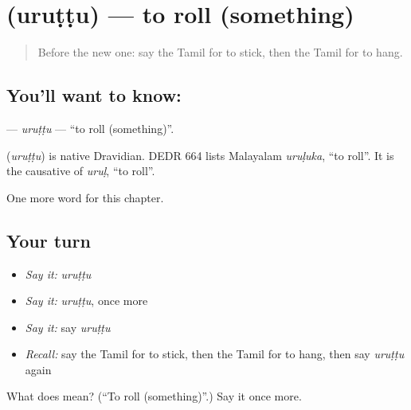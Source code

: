 \section[\texorpdfstring{\ta{உருட்டு} (uruṭṭu)}{உருட்டு (uruṭṭu)}]{ (uruṭṭu) — to roll (something)}

\label{lesson:TA-C167-uruttu}



\begin{quote}
Before the new one: say the Tamil for to stick, then the Tamil for to hang.
\end{quote}

\subsection*{You'll want to know: }
\textbf{} — \emph{uruṭṭu} — \textquotedblleft{}to roll (something)\textquotedblright{}.

\begin{cousinweb}
\textbf{} (\emph{uruṭṭu}) is native Dravidian. DEDR 664 lists Malayalam \emph{uruḷuka}, \textquotedblleft{}to roll\textquotedblright{}. It is the causative of \emph{uruḷ}, \textquotedblleft{}to roll\textquotedblright{}.
\end{cousinweb}

\begin{grammarlens}[title={What you've built}]
One more word for this chapter.
\end{grammarlens}

\subsection*{Your turn}
\begin{itemize}
\raggedright
  \item \emph{Say it:} \emph{uruṭṭu}
  \item \emph{Say it:} \emph{uruṭṭu}, once more
  \item \emph{Say it:} say \emph{uruṭṭu}
  \item \emph{Recall:} say the Tamil for to stick, then the Tamil for to hang, then say \emph{uruṭṭu} again
\end{itemize}

\begin{tcolorbox}[breakable,colback=teal!4,colframe=teal!35!black,title={Before you move on}]
What does  mean? (\textquotedblleft{}To roll (something)\textquotedblright{}.) Say it once more.
\end{tcolorbox}

